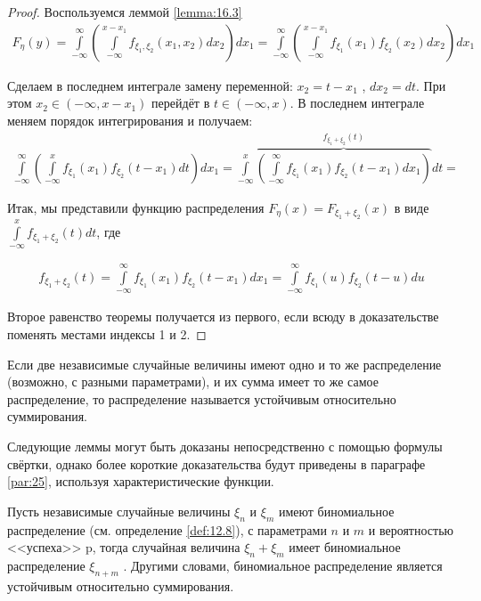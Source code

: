 \begin{proof}
Воспользуемся леммой \ref{lemma:16.3}
\begin{gather*}
	F_\eta (y) =
	\int\limits_{-\infty}^{\infty}\left(
		\int\limits_{-\infty}^{x-x_1 } f_{\xi_1,\xi_2} (x_1 , x_2 ) dx_2
	\right)dx_1=
	\int\limits_{-\infty}^{\infty}\left(
		\int\limits_{-\infty}^{x-x_1 } f_{\xi_1}(x_1)f_{\xi_2}(x_2) dx_2
	\right)dx_1
\end{gather*}

Сделаем в последнем интеграле замену переменной: $x_2 = t - x_1$ , $dx_2 = dt$.
При этом $x_2 \in (-\infty, x - x_1 )$ перейдёт в $t \in (-\infty, x)$. В последнем интеграле меняем порядок интегрирования и получаем:
\begin{gather*}
	\int\limits_{-\infty}^{\infty}\left(
		\int\limits_{-\infty}^{x} f_{\xi_1}(x_1)f_{\xi_2}(t-x_1) dt
	\right)dx_1=
	\int\limits_{-\infty}^{x}\overbrace{\left(
		\int\limits_{-\infty}^{\infty} f_{\xi_1}(x_1)f_{\xi_2}(t-x_1) dx_1
	\right)}^{f_{\xi_1+\xi_2}(t)}dt=
\end{gather*}

Итак, мы представили функцию распределения $F_\eta (x) = F_{\xi_1 +\xi_2} (x)$ в виде $\int\limits_{-\infty}^{x} f_{\xi_1 +\xi_2} (t) dt$, где

\begin{gather*}
	f_{\xi_1 +\xi_2} (t)=\int\limits_{-\infty}^{\infty} f_{\xi_1}(x_1)f_{\xi_2}(t-x_1) dx_1=\int\limits_{-\infty}^{\infty} f_{\xi_1}(u)f_{\xi_2}(t-u) du
\end{gather*}

Второе равенство теоремы получается из первого, если всюду в доказательстве поменять местами индексы 1 и 2.
\end{proof}

\begin{definition}
\label{def:16.7}
Если две независимые случайные величины имеют одно и то же распределение (возможно, с разными параметрами), и их сумма имеет то же самое распределение, то распределение называется устойчивым относительно суммирования.
\end{definition}

\begin{zam}
\label{zam:16.8}
Следующие леммы могут быть доказаны непосредственно с помощью формулы свёртки, однако более короткие доказательства будут приведены в параграфе \ref{par:25}, используя характеристические функции.
\end{zam}

\begin{lemma}
\label{lemma:16.9}
	Пусть независимые случайные величины $\xi_n$ и $\xi_m$ имеют
биномиальное распределение (см. определение \ref{def:12.8}), с параметрами $n$ и $m$ и вероятностью <<успеха>>  p, тогда случайная величина $\xi_n + \xi_m$ имеет биномиальное распределение $\xi_{n+m}$ . Другими словами, биномиальное распределение является устойчивым относительно суммирования.
\end{lemma}

